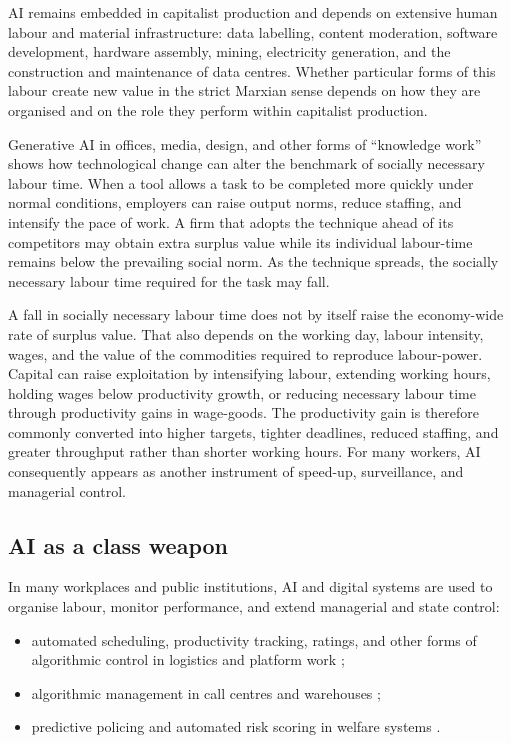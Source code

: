 AI remains embedded in capitalist production and depends on extensive human
labour and material infrastructure: data labelling, content moderation,
software development, hardware assembly, mining, electricity generation, and
the construction and maintenance of data centres. Whether particular forms of
this labour create new value in the strict Marxian sense depends on how they
are organised and on the role they perform within capitalist production.

Generative AI in offices, media, design, and other forms of ``knowledge work''
shows how technological change can alter the benchmark of socially necessary
labour time. When a tool allows a task to be completed more quickly under
normal conditions, employers can raise output norms, reduce staffing, and
intensify the pace of work. A firm that adopts the technique ahead of its
competitors may obtain extra surplus value while its individual labour-time
remains below the prevailing social norm. As the technique spreads, the
socially necessary labour time required for the task may fall.

A fall in socially necessary labour time does not by itself raise the
economy-wide rate of surplus value. That also depends on the working day,
labour intensity, wages, and the value of the commodities required to reproduce
labour-power. Capital can raise exploitation by intensifying labour, extending
working hours, holding wages below productivity growth, or reducing necessary
labour time through productivity gains in wage-goods. The productivity gain is
therefore commonly converted into higher targets, tighter deadlines, reduced
staffing, and greater throughput rather than shorter working hours. For many
workers, AI consequently appears as another instrument of speed-up,
surveillance, and managerial control.

\subsection{AI as a class weapon}

In many workplaces and public institutions, AI and digital systems are used
to organise labour, monitor performance, and extend managerial and state
control:

\begin{itemize}[leftmargin=1.5em]
  \item automated scheduling, productivity tracking, ratings, and other forms
  of algorithmic control in logistics and platform work
  \cite{WoodEtAl2019};

  \item algorithmic management in call centres and warehouses
  \cite{MateescuNguyen2019};

  \item predictive policing and automated risk scoring in welfare systems
  \cite{LumIsaac2016,Eubanks2018}.
\end{itemize}

